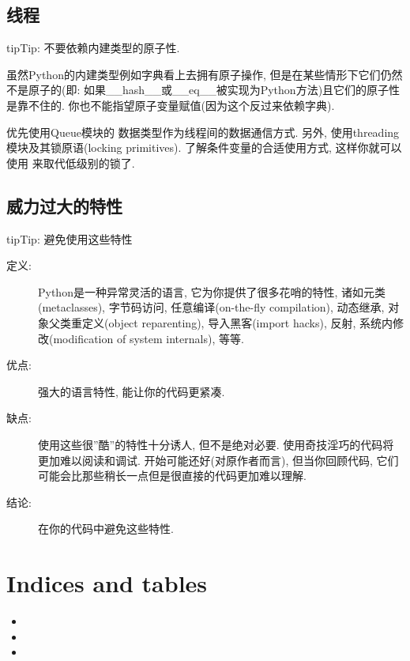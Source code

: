 \documentclass[a4paper,10pt,english]{sphinxmanual}
\begin{document}
\section{线程}
\label{\detokenize{python_language_rules:id14}}
\begin{sphinxadmonition}{tip}{Tip:}
不要依赖内建类型的原子性.
\end{sphinxadmonition}

虽然Python的内建类型例如字典看上去拥有原子操作, 但是在某些情形下它们仍然不是原子的(即: 如果\_\_hash\_\_或\_\_eq\_\_被实现为Python方法)且它们的原子性是靠不住的. 你也不能指望原子变量赋值(因为这个反过来依赖字典).

优先使用Queue模块的  数据类型作为线程间的数据通信方式. 另外, 使用threading模块及其锁原语(locking primitives). 了解条件变量的合适使用方式, 这样你就可以使用  来取代低级别的锁了.


\section{威力过大的特性}
\label{\detokenize{python_language_rules:id15}}
\begin{sphinxadmonition}{tip}{Tip:}
避免使用这些特性
\end{sphinxadmonition}
\begin{description}
\item[{定义:}] \leavevmode
Python是一种异常灵活的语言, 它为你提供了很多花哨的特性, 诸如元类(metaclasses), 字节码访问, 任意编译(on-the-fly compilation), 动态继承, 对象父类重定义(object reparenting), 导入黑客(import hacks), 反射, 系统内修改(modification of system internals), 等等.

\item[{优点:}] \leavevmode
强大的语言特性, 能让你的代码更紧凑.

\item[{缺点:}] \leavevmode
使用这些很”酷”的特性十分诱人, 但不是绝对必要. 使用奇技淫巧的代码将更加难以阅读和调试. 开始可能还好(对原作者而言), 但当你回顾代码, 它们可能会比那些稍长一点但是很直接的代码更加难以理解.

\item[{结论:}] \leavevmode
在你的代码中避免这些特性.

\end{description}


\chapter{Indices and tables}
\label{\detokenize{index:indices-and-tables}}\begin{itemize}
\item {} 

\item {} 

\item {} 

\end{itemize}



\renewcommand{\indexname}{Index}
\printindex
\end{document}
